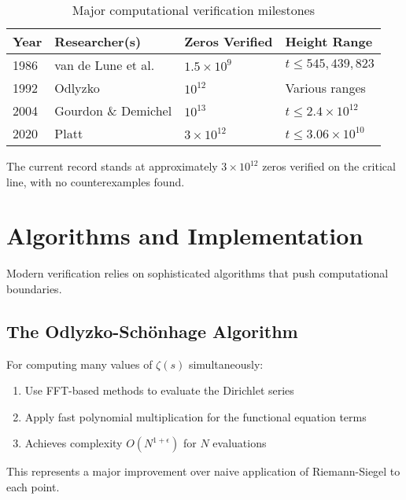 \begin{table}[h]
\centering
\begin{tabular}{|l|l|l|l|}
\hline
\textbf{Year} & \textbf{Researcher(s)} & \textbf{Zeros Verified} & \textbf{Height Range} \\
\hline
1986 & van de Lune et al. & $1.5 \times 10^9$ & $t \leq 545,439,823$ \\
1992 & Odlyzko & $10^{12}$ & Various ranges \\
2004 & Gourdon \& Demichel & $10^{13}$ & $t \leq 2.4 \times 10^{12}$ \\
2020 & Platt & $3 \times 10^{12}$ & $t \leq 3.06 \times 10^{10}$ \\
\hline
\end{tabular}
\caption{Major computational verification milestones}
\end{table}

\begin{remark}
The current record stands at approximately $3 \times 10^{12}$ zeros verified on the critical line, with no counterexamples found.
\end{remark}

\section{Algorithms and Implementation}
\label{sec:algorithms}

Modern verification relies on sophisticated algorithms that push computational boundaries.

\subsection{The Odlyzko-Schönhage Algorithm}

\begin{theorem}
For computing many values of $\zeta(s)$ simultaneously:
\begin{enumerate}
\item Use FFT-based methods to evaluate the Dirichlet series
\item Apply fast polynomial multiplication for the functional equation terms
\item Achieves complexity $O(N^{1+\epsilon})$ for $N$ evaluations
\end{enumerate}
\end{theorem}

This represents a major improvement over naive application of Riemann-Siegel to each point.

